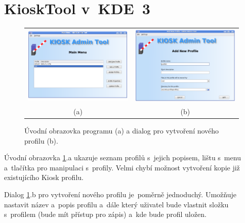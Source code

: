 \section{KioskTool v~KDE~3}
\begin{figure}[h]
\centering
\begin{tabular}{c c}
\includegraphics[width=7.2cm ,keepaspectratio]{obrazky/KioskToolKDE3/uvodni_obrazovka.png}&
\includegraphics[width=7.2cm ,keepaspectratio]{obrazky/KioskToolKDE3/novy_profil.png}\\
(a)&(b)\\
\end{tabular}
\caption{Úvodní obrazovka programu (a) a dialog pro vytvoření nového profilu (b).}
\label{fig_6}
\end{figure}

Úvodní obrazovka \ref{fig_6}.a ukazuje seznam profilů s~jejich popisem, lištu s~menu a~tlačítka pro manipulaci s~profily. Velmi chybí možnost vytvoření kopie již existujícího Kiosk profilu.

Dialog \ref{fig_6}.b pro vytvoření nového profilu je~poměrně jednoduchý. Umožňuje nastavit název a~popis profilu a~dále který uživatel bude vlastnit složku s~profilem (bude mít přístup pro zápis) a~kde bude profil uložen.

